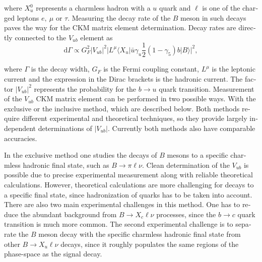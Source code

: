 \documentclass[headings=standardclasses,headings=big,oneside,a4paper,openany,12pt]{scrbook}
\begin{document}
\begin{otherlanguage}{slovene}
where $X_u^0$ represents a charmless hadron with a $u$ quark and $\ell$ is one of the charged leptons $e,~\mu$ or $\tau$. Measuring the decay rate of the $B$ meson in such decays paves the way for the CKM matrix element determination. Decay rates are directly connected to the $V_{ub}$ element as
\begin{equation}
\mathrm{d} \Gamma \propto G_F^2 \vert V_{ub} \vert ^2 \vert L^\mu \langle X_u \vert \bar u \gamma_u \frac{1}{2} (1-\gamma_5) b \vert B \rangle \vert ^2,
\end{equation}

where $\Gamma$ is the decay width, $G_F$ is the Fermi coupling constant, $L^\mu$ is the leptonic current and the expression in the Dirac brackets is the hadronic current. The factor $\vert V_{ub} \vert ^2$ represents the probability for the $b \to u$ quark transition. Measurement of the $V_{ub}$ CKM matrix element can be performed in two possible ways. With the exclusive or the inclusive method, which are described below. Both methods require different experimental and theoretical techniques, so they provide largely independent determinations of $\vert V_{ub} \vert$. Currently both methods also have comparable accuracies. 

In the exclusive method one studies the decays of $B$ mesons to a specific charmless hadronic final state, such as $B \to \pi \ell \nu$. Clean determination of the $V_{ub}$ is possible due to precise experimental measurement along with reliable theoretical calculations. However, theoretical calculations are more challenging for decays to a specific final state, since hadronization of quarks has to be taken into account. There are also two main experimental challenges in this method. One has to reduce the abundant background from $B \to X_c \ell \nu$ processes, since the $b \to c$ quark transition is much more common. The second experimental challenge is to separate the $B$ meson decay with the specific charmless hadronic final state from other $B \to X_u \ell \nu$ decays, since it roughly populates the same regions of the phase-space as the signal decay.


\end{otherlanguage}
\end{document}
